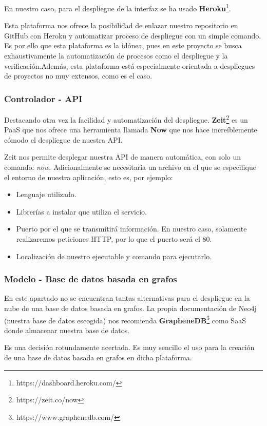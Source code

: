 En nuestro caso, para  el despliegue de la interfaz se ha usado \textbf{Heroku}\footnote{https://dashboard.heroku.com/}.

Esta plataforma nos ofrece la posibilidad de enlazar nuestro repositorio en GitHub con Heroku y automatizar proceso de despliegue con un simple comando. Es por ello que esta plataforma es la idónea, pues en este proyecto se busca exhaustivamente la automatización de procesos como el despliegue y la verificación.Además, esta plataforma está especialmente orientada a despliegues de proyectos no muy extensos, como es el caso.\cite{herokuvs}

\subsubsection{Controlador - API}

Destacando otra vez la facilidad y automatización del despliegue. \textbf{Zeit}\footnote{https://zeit.co/now} es un PaaS que nos ofrece una herramienta llamada \textbf{Now} que nos hace increíblemente cómodo el despliegue de nuestra API.

Zeit nos permite desplegar nuestra API de manera automática, con solo un comando: \textit{now}. Adicionalmente se necesitaría un archivo en el que se especifique el entorno de nuestra aplicación, esto es, por ejemplo:

\begin{itemize}
    \item Lenguaje utilizado.
    \item Librerías a instalar que utiliza el servicio.
    \item Puerto por el que se transmitirá información. En nuestro caso, solamente realizaremos peticiones HTTP, por lo que el puerto será el 80.
    \item Localización de nuestro ejecutable y comando para ejecutarlo.
\end{itemize}

\subsubsection{Modelo - Base de datos basada en grafos}

En este apartado no se encuentran tantas alternativas para el despliegue en la nube de una base de datos basada en grafos. La propia documentación de Neo4j (nuestra base de datos escogida) nos recomienda \textbf{GrapheneDB}\footnote{https://www.graphenedb.com/} como SaaS donde almacenar nuestra base de datos.

Es una decisión rotundamente acertada. Es muy sencillo el uso para la creación de una base de datos basada en grafos en dicha plataforma.